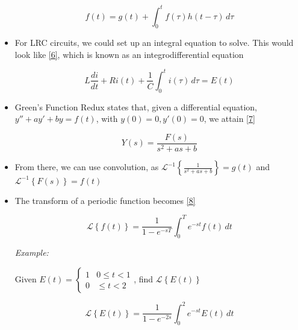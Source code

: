 \documentclass[12pt]{article}
\begin{document}
\begin{itemize}
    \begin{equation}
      f(t)=g(t)+\int_0^t f(\tau)h(t-\tau)\,d\tau
      \label{5}
    \end{equation}

  \item For LRC circuits, we could set up an integral equation to solve. This would look like \eqref{6}, which is known as an integrodifferential equation

    \begin{equation}
      L\frac{di}{dt}+Ri(t)+\frac{1}{C}\int_0^ti(\tau)\,d\tau=E(t)
      \label{6}
    \end{equation}

  \item Green's Function Redux states that, given a differential equation, $y''+ay'+by=f(t)$, with $y(0)=0, y'(0)=0$, we attain \eqref{7}

    \begin{equation}
      Y(s)=\frac{F(s)}{s^2+as+b}
      \label{7}
    \end{equation}

  \item From there, we can use convolution, as $\mathcal{L}^{-1}\left\{ \frac{1}{s^2+as+b} \right\}=g(t)$ and $\mathcal{L}^{-1}\left\{ F(s) \right\}=f(t)$

  \item The transform of a periodic function becomes \eqref{8}

    \begin{equation}
      \mathcal{L}\left\{ f(t) \right\}=\frac{1}{1-e^{-sT}}\int_0^T e^{-st}f(t)\,dt
      \label{8}
    \end{equation}

    \textit{Example:}

    \begin{center}
      Given $E(t)=\left\{\begin{array}{ll} 1 & 0\leq t< 1\\ 0 & \leq t <2 \end{array}$, find $\mathcal{L}\left\{ E(t) \right\}$
    \end{center}

    \begin{equation}
      \mathcal{L}\left\{ E(t) \right\}=\frac{1}{1-e^{-2s}}\int_0^2e^{-st}E(t)\,dt
      \label{9}
    \end{equation}

\end{itemize}
\end{document}
